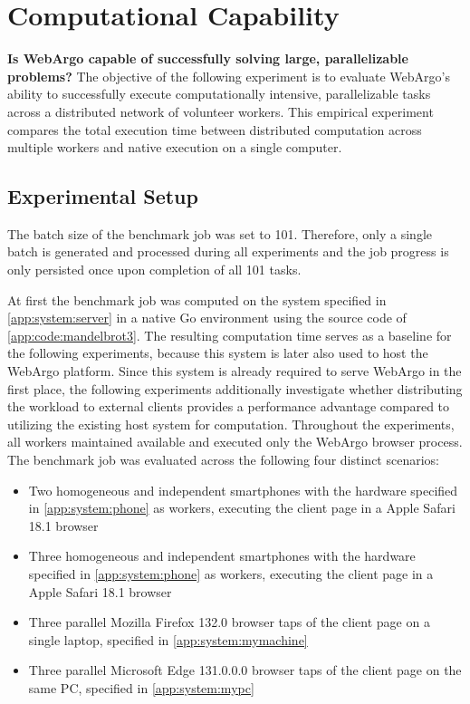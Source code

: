 \section{Computational Capability}
\label{sec:evaluation:computation}
\textbf{Is WebArgo capable of successfully solving large, parallelizable problems?} 
\newline
The objective of the following experiment is to evaluate WebArgo's ability to successfully execute computationally intensive, parallelizable tasks across a distributed network of volunteer workers. This empirical experiment compares the total execution time between distributed computation across multiple workers and native execution on a single computer.

\subsection{Experimental Setup}
The batch size of the benchmark job was set to 101. Therefore, only a single batch is generated and processed during all experiments and the job progress is only persisted once upon completion of all 101 tasks.

At first the benchmark job was computed on the system specified in \autoref{app:system:server} in a native Go environment using the source code of \autoref{app:code:mandelbrot3}. The resulting computation time serves as a baseline for the following experiments, because this system is later also used to host the WebArgo platform. Since this system is already required to serve WebArgo in the first place, the following experiments additionally investigate whether distributing the workload to external clients provides a performance advantage compared to utilizing the existing host system for computation. Throughout the experiments, all workers maintained available and executed only the WebArgo browser process. The benchmark job was evaluated across the following four distinct scenarios:
\begin{itemize}
    \item Two homogeneous and independent smartphones with the hardware specified in \autoref{app:system:phone} as workers, executing the client page in a Apple Safari 18.1 \cite{evaluation:safari} browser
    \item Three homogeneous and independent smartphones with the hardware specified in \autoref{app:system:phone} as workers, executing the client page in a Apple Safari 18.1 \cite{evaluation:safari} browser
    \item Three parallel Mozilla Firefox 132.0 \cite{background:firefox} browser taps of the client page on a single laptop, specified in \autoref{app:system:mymachine}
    \item Three parallel Microsoft Edge 131.0.0.0 \cite{evaluation:edge} browser taps of the client page on the same \acs{PC}, specified in \autoref{app:system:mypc}
\end{itemize}

